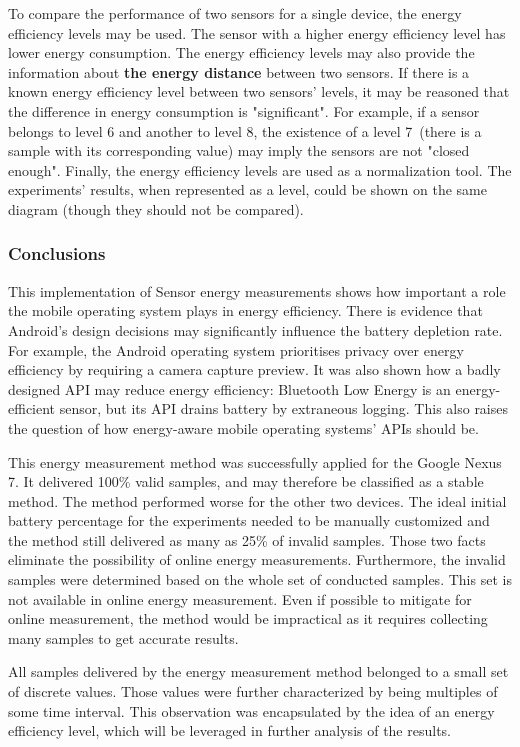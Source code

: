 To compare the performance of two sensors for a single device, the energy efficiency levels may be used. The sensor with a higher energy efficiency level has lower energy consumption. The energy efficiency levels may also provide the information about \textbf{the energy distance} between two sensors. If there is a known energy efficiency level between two sensors' levels, it may be reasoned that the difference in energy consumption is "significant". For example, if a sensor belongs to level 6 and another to level 8, the existence of a level 7\ (there is a sample with its corresponding value) may imply the sensors are not "closed enough". Finally, the energy efficiency levels are used as a normalization tool. The experiments' results, when represented as a level, could be shown on the same diagram (though they should not be compared). 
   
\subsubsection{Conclusions}   
\hspace{10pt} This implementation of Sensor energy measurements shows how important a role the mobile operating system plays in energy efficiency. There is evidence that Android's design decisions may significantly influence the battery depletion rate. For example, the Android operating system prioritises privacy over energy efficiency by requiring a camera capture preview. It was also shown how a badly designed API may reduce energy efficiency: Bluetooth Low Energy is an energy-efficient sensor, but its API drains battery by extraneous logging. This also raises the question of how energy-aware mobile operating systems' APIs should be.

This energy measurement method was successfully applied for the Google Nexus 7. It delivered 100\% valid samples, and may therefore be classified as a stable method. The method performed worse for the other two devices. The ideal initial battery percentage for the experiments needed to be manually customized and the method still delivered as many as 25\% of invalid samples. Those two facts eliminate the possibility of online energy measurements. Furthermore, the invalid samples were determined based on the whole set of conducted samples. This set is not available in online energy measurement. Even if possible to mitigate for online measurement, the method would be impractical as it requires collecting many samples to get accurate results.  

All samples delivered by the energy measurement method belonged to a small set of discrete values. Those values were further characterized by being multiples of some time interval. This observation was encapsulated by the idea of an energy efficiency level, which will be leveraged in further analysis of the results. 

